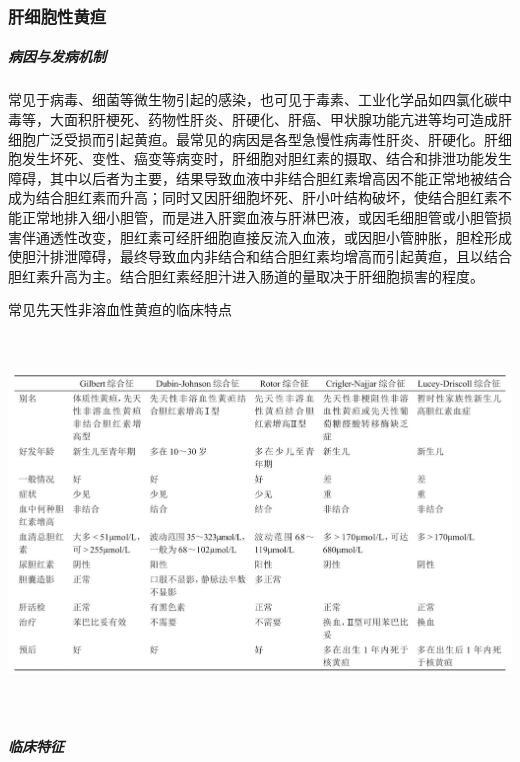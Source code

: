 \subsubsection{肝细胞性黄疸}

\subparagraph{病因与发病机制}

常见于病毒、细菌等微生物引起的感染，也可见于毒素、工业化学品如四氯化碳中毒等，大面积肝梗死、药物性肝炎、肝硬化、肝癌、甲状腺功能亢进等均可造成肝细胞广泛受损而引起黄疸。最常见的病因是各型急慢性病毒性肝炎、肝硬化。肝细胞发生坏死、变性、癌变等病变时，肝细胞对胆红素的摄取、结合和排泄功能发生障碍，其中以后者为主要，结果导致血液中非结合胆红素增高因不能正常地被结合成为结合胆红素而升高；同时又因肝细胞坏死、肝小叶结构破坏，使结合胆红素不能正常地排入细小胆管，而是进入肝窦血液与肝淋巴液，或因毛细胆管或小胆管损害伴通透性改变，胆红素可经肝细胞直接反流入血液，或因胆小管肿胀，胆栓形成使胆汁排泄障碍，最终导致血内非结合和结合胆红素均增高而引起黄疸，且以结合胆红素升高为主。结合胆红素经胆汁进入肠道的量取决于肝细胞损害的程度。

\begin{table}[htbp]
\centering
\caption{常见先天性非溶血性黄疸的临床特点}
\label{tab16-1}
\includegraphics[width=6.61458in,height=3.94792in]{./images/Image00063.jpg}
\end{table}

\subparagraph{临床特征}

